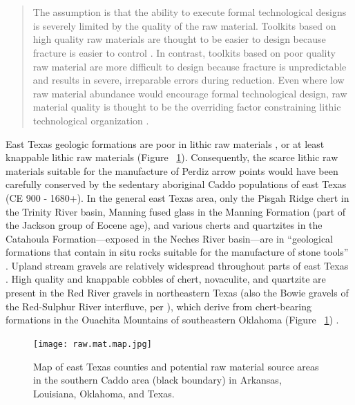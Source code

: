 \documentclass[review]{elsarticle}
\begin{document}
\linenumbers

\section*{}

\begin{quote}
The assumption is that the ability to execute formal technological designs is severely limited by the quality of the raw material. Toolkits based on high quality raw materials are thought to be easier to design because fracture is easier to control \citep{RN4315,RN8924}. In contrast, toolkits based on poor quality raw material are more difficult to design because fracture is unpredictable and results in severe, irreparable errors during reduction. Even where low raw material abundance would encourage formal technological design, raw material quality is thought to be the overriding factor constraining lithic technological organization \citep[257]{RN5907}.
\end{quote}

East Texas geologic formations are poor in lithic raw materials \citep[Figure 2.1]{RN439}, or at least knappable lithic raw materials (Figure ~\ref{fig:raw.map}). Consequently, the scarce lithic raw materials suitable for the manufacture of Perdiz arrow points would have been carefully conserved by the sedentary aboriginal Caddo populations of east Texas (CE 900 - 1680+). In the general east Texas area, only the Pisgah Ridge chert in the Trinity River basin, Manning fused glass in the Manning Formation (part of the Jackson group of Eocene age), and various cherts and quartzites in the Catahoula Formation---exposed in the Neches River basin---are in “geological formations that contain in situ rocks suitable for the manufacture of stone tools” \citep[49]{RN439}. Upland stream gravels are relatively widespread throughout parts of east Texas \citep[56-57]{RN439}. High quality and knappable cobbles of chert, novaculite, and quartzite are present in the Red River gravels in northeastern Texas (also the Bowie gravels of the Red-Sulphur River interfluve, per \citet{RN846}), which derive from chert-bearing formations in the Ouachita Mountains of southeastern Oklahoma (Figure ~\ref{fig:raw.map}) \citep[Figure 1.20]{RN439}.

\begin{figure}[!]\centering
\texttt{[image: raw.mat.map.jpg]}
\caption{Map of east Texas counties and potential raw material source areas in the southern Caddo area (black boundary) in Arkansas, Louisiana, Oklahoma, and Texas.}
\label{fig:raw.map}
\end{figure}
\end{document}
